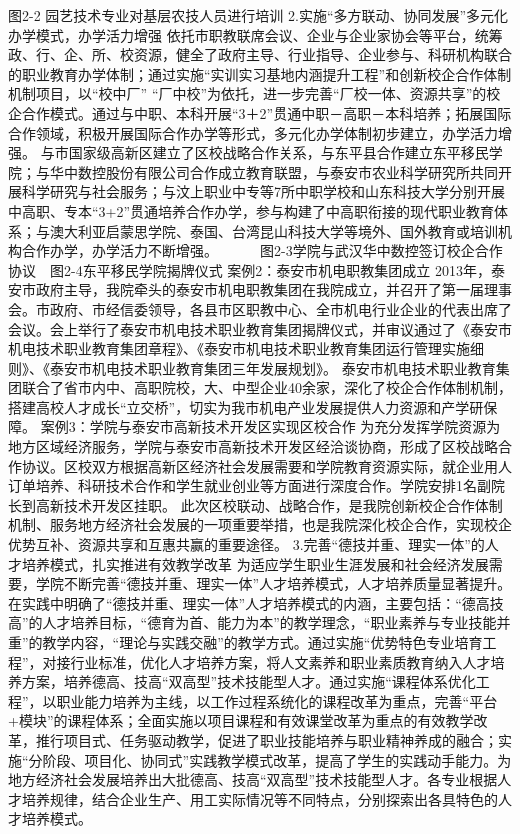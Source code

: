 图2-2  园艺技术专业对基层农技人员进行培训
2.实施“多方联动、协同发展”多元化办学模式，办学活力增强
依托市职教联席会议、企业与企业家协会等平台，统筹政、行、企、所、校资源，健全了政府主导、行业指导、企业参与、科研机构联合的职业教育办学体制；通过实施“实训实习基地内涵提升工程”和创新校企合作体制机制项目，以“校中厂” “厂中校”为依托，进一步完善“厂校一体、资源共享”的校企合作模式。通过与中职、本科开展“3＋2”贯通中职－高职－本科培养；拓展国际合作领域，积极开展国际合作办学等形式，多元化办学体制初步建立，办学活力增强。
与市国家级高新区建立了区校战略合作关系，与东平县合作建立东平移民学院；与华中数控股份有限公司合作成立教育联盟，与泰安市农业科学研究所共同开展科学研究与社会服务；与汶上职业中专等7所中职学校和山东科技大学分别开展中高职、专本“3+2”贯通培养合作办学，参与构建了中高职衔接的现代职业教育体系；与澳大利亚启蒙思学院、泰国、台湾昆山科技大学等境外、国外教育或培训机构合作办学，办学活力不断增强。
　 　 
图2-3学院与武汉华中数控签订校企合作协议　图2-4东平移民学院揭牌仪式
案例2：泰安市机电职教集团成立
2013年，泰安市政府主导，我院牵头的泰安市机电职教集团在我院成立，并召开了第一届理事会。市政府、市经信委领导，各县市区职教中心、全市机电行业企业的代表出席了会议。会上举行了泰安市机电技术职业教育集团揭牌仪式，并审议通过了《泰安市机电技术职业教育集团章程》、《泰安市机电技术职业教育集团运行管理实施细则》、《泰安市机电技术职业教育集团三年发展规划》。
泰安市机电技术职业教育集团联合了省市内中、高职院校，大、中型企业40余家，深化了校企合作体制机制，搭建高校人才成长“立交桥”，切实为我市机电产业发展提供人力资源和产学研保障。
案例3：学院与泰安市高新技术开发区实现区校合作
为充分发挥学院资源为地方区域经济服务，学院与泰安市高新技术开发区经洽谈协商，形成了区校战略合作协议。区校双方根据高新区经济社会发展需要和学院教育资源实际，就企业用人订单培养、科研技术合作和学生就业创业等方面进行深度合作。学院安排1名副院长到高新技术开发区挂职。
此次区校联动、战略合作，是我院创新校企合作体制机制、服务地方经济社会发展的一项重要举措，也是我院深化校企合作，实现校企优势互补、资源共享和互惠共赢的重要途径。
3.完善“德技并重、理实一体”的人才培养模式，扎实推进有效教学改革
为适应学生职业生涯发展和社会经济发展需要，学院不断完善“德技并重、理实一体”人才培养模式，人才培养质量显著提升。在实践中明确了“德技并重、理实一体”人才培养模式的内涵，主要包括：“德高技高”的人才培养目标，“德育为首、能力为本”的教学理念，“职业素养与专业技能并重”的教学内容，“理论与实践交融”的教学方式。通过实施“优势特色专业培育工程”，对接行业标准，优化人才培养方案，将人文素养和职业素质教育纳入人才培养方案，培养德高、技高“双高型”技术技能型人才。通过实施“课程体系优化工程”，以职业能力培养为主线，以工作过程系统化的课程改革为重点，完善“平台+模块”的课程体系；全面实施以项目课程和有效课堂改革为重点的有效教学改革，推行项目式、任务驱动教学，促进了职业技能培养与职业精神养成的融合；实施“分阶段、项目化、协同式”实践教学模式改革，提高了学生的实践动手能力。为地方经济社会发展培养出大批德高、技高“双高型”技术技能型人才。各专业根据人才培养规律，结合企业生产、用工实际情况等不同特点，分别探索出各具特色的人才培养模式。
